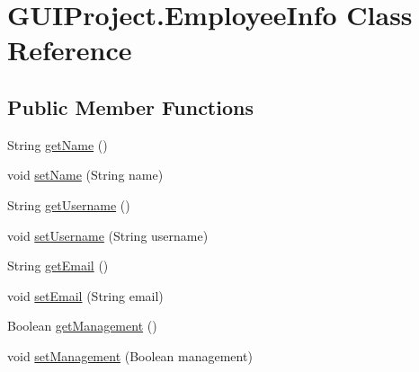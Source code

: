\hypertarget{class_g_u_i_project_1_1_employee_info}{}\section{G\+U\+I\+Project.\+Employee\+Info Class Reference}
\label{class_g_u_i_project_1_1_employee_info}
\subsection*{Public Member Functions}
\begin{DoxyCompactItemize}
\item 
String \mbox{\hyperlink{class_g_u_i_project_1_1_employee_info_a86c735f9f69bf5dd090006da7d39200f}{get\+Name}} ()
\item 
void \mbox{\hyperlink{class_g_u_i_project_1_1_employee_info_ae75f9f9b22c047d3259a8ad1fd08682e}{set\+Name}} (String name)
\item 
String \mbox{\hyperlink{class_g_u_i_project_1_1_employee_info_a2af47ab007131039a5fd8754c6126285}{get\+Username}} ()
\item 
void \mbox{\hyperlink{class_g_u_i_project_1_1_employee_info_a8b4c4c3e85910d492f57743fd982660d}{set\+Username}} (String username)
\item 
String \mbox{\hyperlink{class_g_u_i_project_1_1_employee_info_a763f619de772d5b8f1beaf5844359525}{get\+Email}} ()
\item 
void \mbox{\hyperlink{class_g_u_i_project_1_1_employee_info_a9a85ee58dcc3ff7f4f4c36a744d4a053}{set\+Email}} (String email)
\item 
Boolean \mbox{\hyperlink{class_g_u_i_project_1_1_employee_info_ac8a3e0faa30e47b980839e27873052b0}{get\+Management}} ()
\item 
void \mbox{\hyperlink{class_g_u_i_project_1_1_employee_info_afdbc7d5956a0e2befab118ad75c7865a}{set\+Management}} (Boolean management)
\end{DoxyCompactItemize}

